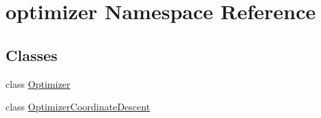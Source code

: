 \hypertarget{namespaceoptimizer}{}\section{optimizer Namespace Reference}
\label{namespaceoptimizer}
\subsection*{Classes}
\begin{DoxyCompactItemize}
\item 
class \hyperlink{classoptimizer_1_1_optimizer}{Optimizer}
\item 
class \hyperlink{classoptimizer_1_1_optimizer_coordinate_descent}{Optimizer\+Coordinate\+Descent}
\end{DoxyCompactItemize}
